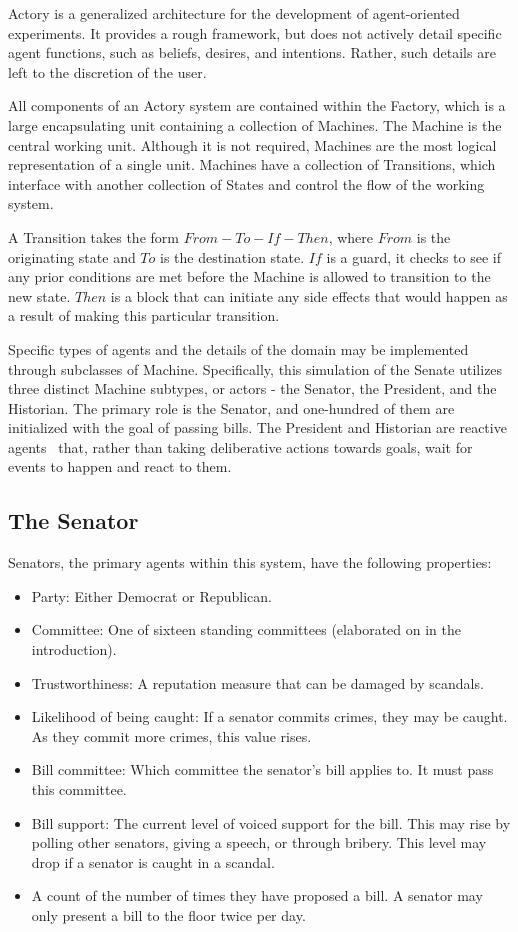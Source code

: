 \documentclass{sig-alternate}
\newenvironment{smallitem}
 {\setlength{\topsep}{0pt}
  \setlength{\partopsep}{0pt}
  \setlength{\parskip}{0pt}
  \begin{itemize}
   \setlength{\leftmargin}{.2in}
  \setlength{\parsep}{0pt}
  \setlength{\parskip}{0pt}
  \setlength{\itemsep}{0pt}}
 {\end{itemize}}
\newcommand{\bi}{\begin{smallitem}}
\newcommand{\ei}{\end{smallitem}}
\begin{document}
Actory is a generalized architecture for the development of 
agent-oriented experiments. It provides a rough framework, but does
not actively detail specific agent functions, such as beliefs, desires,
and intentions. Rather, such details are left to the discretion of the
user. 

All components of an Actory system are contained within the Factory, 
which is a large encapsulating unit containing a collection of Machines.
The Machine is the central working unit. Although it is not required,
Machines are the most logical representation of a single unit. 
Machines have a collection of Transitions, which interface with another 
collection of States and control the flow of the working system. 

A Transition takes the form $From - To - If - Then$, where $From$ is
the originating state and $To$ is the destination state. $If$ is a 
guard, it checks to see if any prior conditions are met before the 
Machine is allowed to transition to the new state. $Then$ is a block 
that can initiate any side effects that would happen as a result of
making this particular transition. 

Specific types of agents and the details of the domain
may be implemented through subclasses of Machine. 
Specifically, this simulation of the Senate utilizes three 
distinct Machine subtypes, or actors - 
the Senator, the President, and the Historian. The primary role is the 
Senator, and one-hundred of them are initialized with the goal of 
passing bills. The President and Historian are reactive agents~\cite{woolridge} that, rather than taking deliberative actions towards goals, wait for events to happen and react to them. 

\subsection{The Senator}

Senators, the primary agents within this system, have the following properties:
\bi
\item Party: Either Democrat or Republican.
\item Committee: One of sixteen standing committees (elaborated on in the introduction).
\item Trustworthiness: A reputation measure that can be damaged by scandals.
\item Likelihood of being caught: If a senator commits crimes, they may be caught. As they commit more crimes, this value rises.
\item Bill committee: Which committee the senator's bill applies to. It must pass this committee.
\item Bill support: The current level of voiced support for the bill. This may rise by polling other senators, giving a speech, or through bribery. This level may drop if a senator is caught in a scandal. 
\item A count of the number of times they have proposed a bill. A senator may only present a bill to the floor twice per day.
\ei
\end{document}
